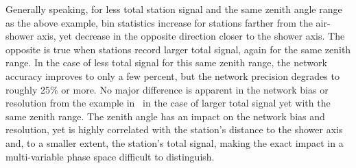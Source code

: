 Generally speaking, for less total station signal and the same zenith angle range as the above example, bin statistics increase for stations farther from the air-shower axis, yet decrease in the opposite direction closer to the shower axis.
The opposite is true when stations record larger total signal, again for the same zenith range.
In the case of less total signal for this same zenith range, the network accuracy improves to only a few percent, but the network precision degrades to roughly 25\% or more.
No major difference is apparent in the network bias or resolution from the example in~ in the case of larger total signal yet with the same zenith range.
The zenith angle has an impact on the network bias and resolution, yet is highly correlated with the station's distance to the shower axis and, to a smaller extent, the station's total signal, making the exact impact in a multi-variable phase space difficult to distinguish.















